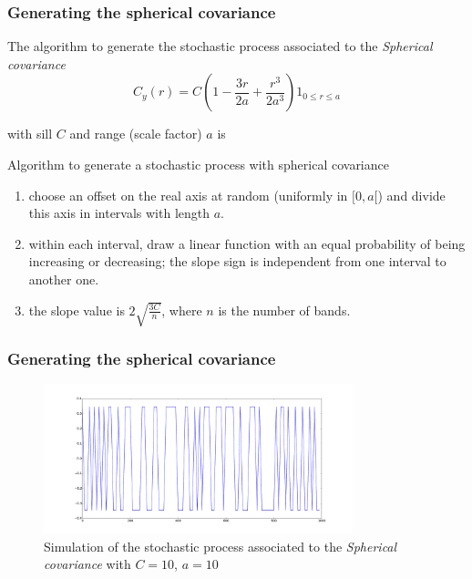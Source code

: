 \documentclass{beamer}
\begin{document}
\begin{frame}
 \frametitle{Generating the spherical covariance}
   The algorithm to generate the stochastic process associated to the \textit{Spherical covariance} 
   \begin{equation}
    C_y(r) = C(1-\frac{3r}{2a} + \frac{r^3}{2a^3})1_{0\leq r \leq a}
   \end{equation}
   
   with sill $C$ and range (scale factor) $a$ is
   
   \begin{block}{Algorithm to generate a stochastic process with spherical covariance}
    \begin{enumerate}
     \item choose an offset on the real axis at random
(uniformly in $[0,a[$) and divide this axis in
intervals with length $a$.
      \item within each interval, draw a linear function with
an equal probability of being increasing or
decreasing; the slope sign is independent from
one interval to another one.
       \item the slope value is $2 \sqrt{\frac{3 C}{n}} $, where $n$ is the number of bands.
    \end{enumerate}

   \end{block}


\end{frame}


\begin{frame}
 \frametitle{Generating the spherical covariance}

 \begin{figure}
\begin{center}
\includegraphics[width=0.8\textwidth]{sthocastic_simulation_spherical.pdf}
\end{center}
\caption{Simulation of the stochastic process associated to the \textit{Spherical covariance} with $C = 10$, $a = 10$}
\label{fig:sthoc_spherical_simulation}
\end{figure}

 
\end{frame}
\end{document}

